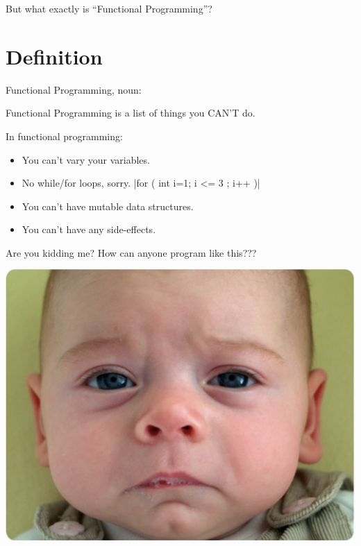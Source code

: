 \documentclass{beamer}
\begin{document}
\begin{frame}

  \begin{center}
  {\Huge But what exactly is ``Functional Programming''?}
  \end{center}

\end{frame}

\section{Definition}

\begin{frame}{Functional Programming, noun:}

  \begin{exampleblock}{}
    {\Huge
      Functional Programming is a list of things you CAN’T do.
      }
    \vskip5mm
    \hspace*{}
  \end{exampleblock}
\end{frame}

\begin{frame}

In functional programming:

  \begin{itemize}[<+->]
  \item You can't vary your variables.
  \item No while/for loops, sorry.
    |for ( int i=1; i <= 3 ; i++ )|
  \item You can't have mutable data structures.
  \item You can't have any side-effects.
  \end{itemize}
\end{frame}

\begin{frame}{Are you kidding me?}
  How can anyone program like this???
  \begin{center}
    \includegraphics[scale=0.3]{img/sadbaby.png}
  \end{center}
\end{frame}
\end{document}
